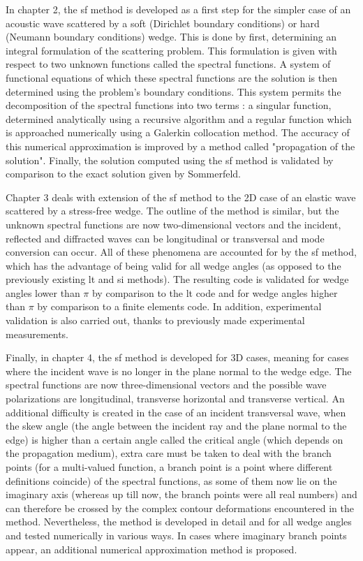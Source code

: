 In chapter 2, the \acrfull{sf} method is developed as a first step for the simpler case of an acoustic wave scattered by a soft (Dirichlet boundary conditions) or hard (Neumann boundary conditions) wedge. This is done by first, determining an integral formulation of the scattering problem. This formulation is given with respect to two unknown functions called the spectral functions. A system of functional equations of which these spectral functions are the solution is then determined using the problem's boundary conditions. This system permits the decomposition of the spectral functions into two terms : a singular function, determined analytically using a recursive algorithm and a regular function which is approached numerically using a Galerkin collocation method. The accuracy of this numerical approximation is improved by a method called "propagation of the solution". Finally, the solution computed using the \acrlong{sf} method is validated by comparison to the exact solution given by Sommerfeld.

Chapter 3 deals with extension of the \acrlong{sf} method to the 2D case of an elastic wave scattered by a stress-free wedge. The outline of the method is similar, but the unknown spectral functions are now two-dimensional vectors and the incident, reflected and diffracted waves can be longitudinal or transversal and mode conversion can occur. All of these phenomena are accounted for by the \acrlong{sf} method, which has the advantage of being valid for all wedge angles (as opposed to the previously existing \acrfull{lt} and \acrfull{si} methods). The resulting code is validated for wedge angles lower than $\pi$ by comparison to the \acrshort{lt} code and for wedge angles higher than $\pi$ by comparison to a finite elements code. In addition, experimental validation is also carried out, thanks to previously made experimental measurements.

Finally, in chapter 4, the \acrlong{sf} method is developed for 3D cases, meaning for cases where the incident wave is no longer in the plane normal to the wedge edge. The spectral functions are now three-dimensional vectors and the possible wave polarizations are longitudinal, transverse horizontal and transverse vertical. An additional difficulty is created in the case of an incident transversal wave, when the skew angle (the angle between the incident ray and the plane normal to the edge) is higher than a certain angle called the critical angle (which depends on the propagation medium), extra care must be taken to deal with the branch points (for a multi-valued function, a branch point is a point where different definitions coincide) of the spectral functions, as some of them now lie on the imaginary axis (whereas up till now, the branch points were all real numbers) and can therefore be crossed by the complex contour deformations encountered in the method. Nevertheless, the method is developed in detail and for all wedge angles and tested numerically in various ways. In cases where imaginary branch points appear, an additional numerical approximation method is proposed.